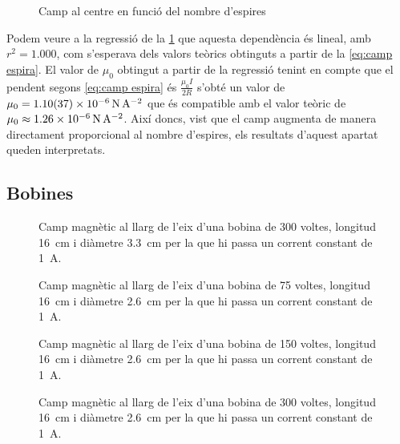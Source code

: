 \begin{figure}[htb]
  \centering
	
  \caption{Camp al centre en funció del nombre d'espires}
  \label{fig:camp vs n}
\end{figure}

Podem veure a la regressió de la \cref{fig:camp vs n} que aquesta dependència és lineal, amb $r^2=1.000$, com s'esperava dels valors teòrics obtinguts a partir de la \cref{eq:camp espira}. El valor de $\mu_{0}$ obtingut a partir de la regressió tenint en compte que el pendent segons \cref{eq:camp espira} és $\frac{\mu_{0}I}{2R}$  s'obté un valor de $\mu_{0} = \data{1.10}{0.37d-6}{N.A^{-2}} $ que és compatible amb el valor teòric de $\mu_{0}\approx \SI{1.26d-6}{N.A^{-2}} $. Així doncs, vist que el camp augmenta de manera directament proporcional al nombre d'espires, els resultats d'aquest apartat queden interpretats.

\subsection{Bobines}\label{sec:bobines}
\begin{figure}[tp]
	\sffamily \small
	\centering
	
	\caption{Camp magnètic al llarg de l'eix d'una bobina de 300 voltes, longitud \SI{16}{cm} i diàmetre \SI{3.3}{cm} per la que hi passa un corrent constant de \SI{1}{A}.}
	\label{fig:camp 300/33}
\end{figure}

\begin{figure}[tp]
	\sffamily \small
	\centering
	
	\caption{Camp magnètic al llarg de l'eix d'una bobina de 75 voltes, longitud \SI{16}{cm} i diàmetre \SI{2.6}{cm} per la que hi passa un corrent constant de \SI{1}{A}.}
	\label{fig:camp 75/26}
\end{figure}

\begin{figure}[tp]
	\sffamily \small
	\centering
	
	\caption{Camp magnètic al llarg de l'eix d'una bobina de 150 voltes, longitud \SI{16}{cm} i diàmetre \SI{2.6}{cm} per la que hi passa un corrent constant de \SI{1}{A}.}
	\label{fig:camp 150/26}
\end{figure}

\begin{figure}[tp]
	\sffamily \small
	\centering
	
	\caption{Camp magnètic al llarg de l'eix d'una bobina de 300 voltes, longitud \SI{16}{cm} i diàmetre \SI{2.6}{cm} per la que hi passa un corrent constant de \SI{1}{A}.}
	\label{fig:camp 300/26}
\end{figure}

